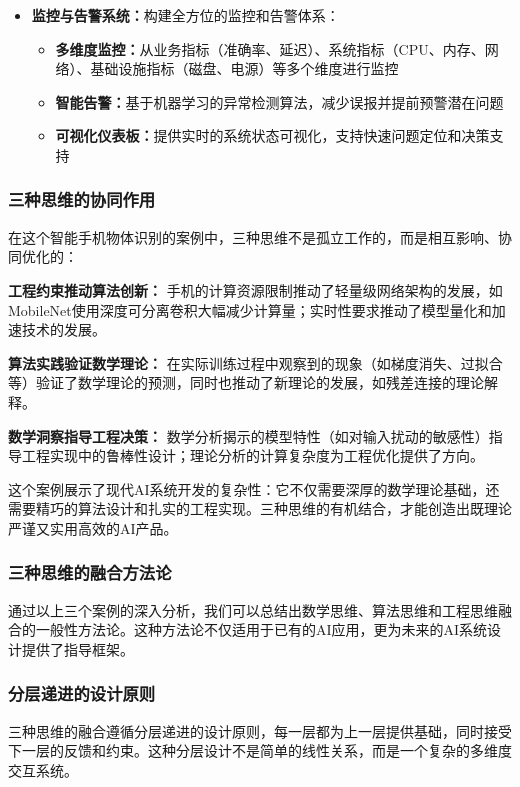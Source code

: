 \begin{itemize}
\item \textbf{监控与告警系统：}构建全方位的监控和告警体系：
\begin{itemize}
\item \textbf{多维度监控：}从业务指标（准确率、延迟）、系统指标（CPU、内存、网络）、基础设施指标（磁盘、电源）等多个维度进行监控
\item \textbf{智能告警：}基于机器学习的异常检测算法，减少误报并提前预警潜在问题
\item \textbf{可视化仪表板：}提供实时的系统状态可视化，支持快速问题定位和决策支持
\end{itemize}
\end{itemize}

\subsubsection{三种思维的协同作用}

在这个智能手机物体识别的案例中，三种思维不是孤立工作的，而是相互影响、协同优化的：

\textbf{工程约束推动算法创新：}
手机的计算资源限制推动了轻量级网络架构的发展，如MobileNet使用深度可分离卷积大幅减少计算量；实时性要求推动了模型量化和加速技术的发展。

\textbf{算法实践验证数学理论：}
在实际训练过程中观察到的现象（如梯度消失、过拟合等）验证了数学理论的预测，同时也推动了新理论的发展，如残差连接的理论解释。

\textbf{数学洞察指导工程决策：}
数学分析揭示的模型特性（如对输入扰动的敏感性）指导工程实现中的鲁棒性设计；理论分析的计算复杂度为工程优化提供了方向。

这个案例展示了现代AI系统开发的复杂性：它不仅需要深厚的数学理论基础，还需要精巧的算法设计和扎实的工程实现。三种思维的有机结合，才能创造出既理论严谨又实用高效的AI产品。

\subsubsection{三种思维的融合方法论}

通过以上三个案例的深入分析，我们可以总结出数学思维、算法思维和工程思维融合的一般性方法论。这种方法论不仅适用于已有的AI应用，更为未来的AI系统设计提供了指导框架。

\subsubsection{分层递进的设计原则}

三种思维的融合遵循分层递进的设计原则，每一层都为上一层提供基础，同时接受下一层的反馈和约束。这种分层设计不是简单的线性关系，而是一个复杂的多维度交互系统。

